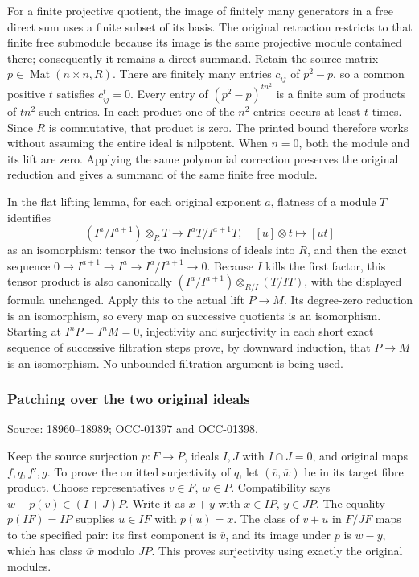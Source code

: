 For a finite projective quotient, the image of finitely many generators in a free direct sum uses a finite subset of its basis. The original retraction restricts to that finite free submodule because its image is the same projective module contained there; consequently it remains a direct summand. Retain the source matrix \(p\in\operatorname{Mat}(n\times n,R)\). There are finitely many entries \(c_{ij}\) of \(p^2-p\), so a common positive \(t\) satisfies \(c_{ij}^t=0\). Every entry of \((p^2-p)^{tn^2}\) is a finite sum of products of \(tn^2\) such entries. In each product one of the \(n^2\) entries occurs at least \(t\) times. Since \(R\) is commutative, that product is zero. The printed bound therefore works without assuming the entire ideal is nilpotent. When \(n=0\), both the module and its lift are zero. Applying the same polynomial correction preserves the original reduction and gives a summand of the same finite free module.

In the flat lifting lemma, for each original exponent \(a\), flatness of a module \(T\) identifies \[
(I^a/I^{a+1})\otimes_RT\longrightarrow I^aT/I^{a+1}T,
\quad [u]\otimes t\longmapsto[ut]
\] as an isomorphism: tensor the two inclusions of ideals into \(R\), and then the exact sequence \(0\to I^{a+1}\to I^a\to I^a/I^{a+1}\to0\). Because \(I\) kills the first factor, this tensor product is also canonically \((I^a/I^{a+1})\otimes_{R/I}(T/IT)\), with the displayed formula unchanged. Apply this to the actual lift \(P\to M\). Its degree-zero reduction is an isomorphism, so every map on successive quotients is an isomorphism. Starting at \(I^nP=I^nM=0\), injectivity and surjectivity in each short exact sequence of successive filtration steps prove, by downward induction, that \(P\to M\) is an isomorphism. No unbounded filtration argument is being used.

\subsubsection{Patching over the two original ideals}\label{patching-over-the-two-original-ideals}

Source: 18960--18989; OCC-01397 and OCC-01398.

Keep the source surjection \(p:F\to P\), ideals \(I,J\) with \(I\cap J=0\), and original maps \(f,q,f',g\). To prove the omitted surjectivity of \(q\), let \((\overline v,\overline w)\) be in its target fibre product. Choose representatives \(v\in F\), \(w\in P\). Compatibility says \(w-p(v)\in(I+J)P\). Write it as \(x+y\) with \(x\in IP\), \(y\in JP\). The equality \(p(IF)=IP\) supplies \(u\in IF\) with \(p(u)=x\). The class of \(v+u\) in \(F/JF\) maps to the specified pair: its first component is \(\overline v\), and its image under \(p\) is \(w-y\), which has class \(\overline w\) modulo \(JP\). This proves surjectivity using exactly the original modules.

